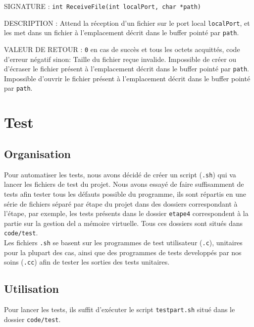 \documentclass{article}
\begin{document}
		\begin{description}
			\item{SIGNATURE : } \texttt{int ReceiveFile(int localPort, char *path)}
			\item{DESCRIPTION : Attend la réception d'un fichier sur le port local \texttt{localPort}, et les met dans un fichier à l'emplacement décrit dans le buffer pointé par \texttt{path}.} 
			\item{VALEUR DE RETOUR : } \texttt{0} en cas de succès et tous les octets acquittés, code d'erreur négatif sinon: 
				 Taille du fichier reçue invalide.
				 Impossible de créer ou d'écraser le fichier présent à l'emplacement décrit dans le buffer pointé par \texttt{path}.
				 Impossible d'ouvrir le fichier présent à l'emplacement décrit dans le buffer pointé par \texttt{path}.
		\end{description}
		\vspace{2.5mm}

\section{Test}
	\subsection{Organisation}
		{Pour automatiser les tests, nous avons décidé de créer un script (\texttt{.sh}) qui va lancer les fichiers de test du projet. 
		Nous avons essayé de faire suffisamment de tests afin tester tous les défauts possible du programme, ils sont répartis en une série de fichiers séparé par étape du projet dans des dossiers correspondant à l'étape, par exemple, les tests présents dans le dossier \texttt{etape4} correspondent à la partie sur la gestion del a mémoire virtuelle. Tous ces dossiers sont situés dans \texttt{code/test}. \\
		Les fichiers \texttt{.sh} se basent sur les programmes de test utilisateur (\texttt{.c}), unitaires pour la plupart des cas, ainsi que des programmes de tests developpés par nos soins (\texttt{.cc}) afin de tester les sorties des tests unitaires.}

	\subsection{Utilisation}
		{Pour lancer les tests, ils suffit d'exécuter le script \texttt{testpart.sh} situé dans le dossier \texttt{code/test}.}
\end{document}
